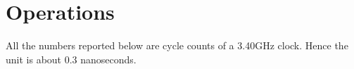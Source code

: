 \section{Operations}
All the numbers reported below are cycle counts of a 3.40GHz clock.
Hence the unit is about 0.3 nanoseconds.


